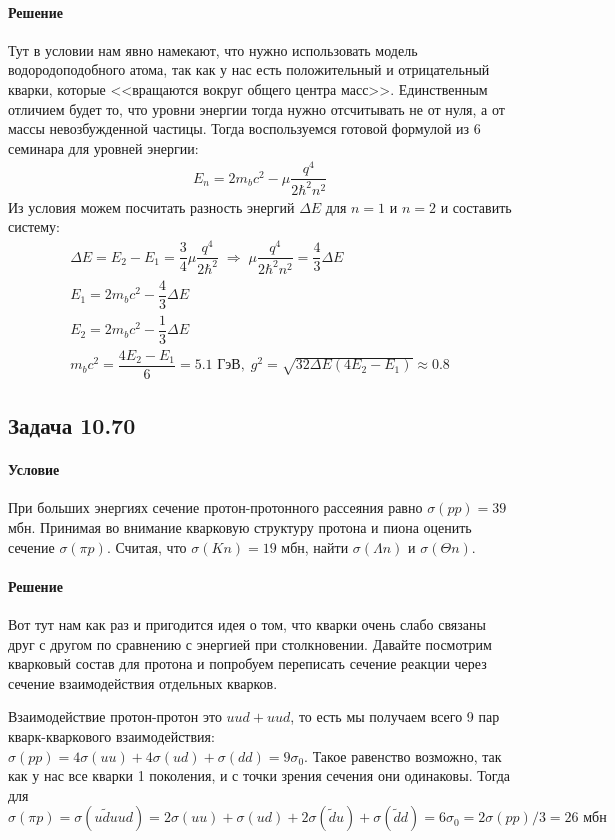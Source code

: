 \documentclass[12pt]{article}
\begin{document}
\paragraph{Решение}
Тут в условии нам явно намекают, что нужно использовать модель водородоподобного атома, так как у нас есть положительный и отрицательный кварки, которые <<вращаются вокруг общего центра масс>>. Единственным отличием будет то, что уровни энергии тогда нужно отсчитывать не от нуля, а от массы невозбужденной частицы. Тогда воспользуемся готовой формулой из 6 семинара для уровней энергии:
\begin{gather*}
    E_n = 2m_bc^2 - \mu\dfrac{q^4}{2\hbar^2n^2}
\end{gather*}
Из условия можем посчитать разность энергий $\Delta E$ для $n=1$ и $n=2$ и составить систему:
\begin{gather*}
    \Delta E = E_2 - E_1 = \dfrac{3}{4}\mu\dfrac{q^4}{2\hbar^2} \; \Rightarrow \; \mu\dfrac{q^4}{2\hbar^2n^2} = \dfrac{4}{3}\Delta E\\
    E_1 = 2m_bc^2 - \dfrac{4}{3}\Delta E\\
    E_2 = 2m_bc^2 - \dfrac{1}{3}\Delta E\\
    m_bc^2 = \dfrac{4E_2-E_1}{6} = 5.1 \text{ ГэВ}, \; g^2=\sqrt{32\Delta E(4E_2-E_1)} \approx 0.8
\end{gather*}

\subsection{Задача 10.70}
\label{task_10.70}
\paragraph{Условие}
При больших энергиях сечение протон-протонного рассеяния равно $\sigma(pp) = 39$ мбн. Принимая во внимание кварковую структуру протона и пиона оценить сечение $\sigma(\pi p)$. Считая, что $\sigma(Kn) = 19$ мбн, найти $\sigma(\Lambda n)$ и $\sigma(\Theta n)$.
\paragraph{Решение}
Вот тут нам как раз и пригодится идея о том, что кварки очень слабо связаны друг с другом по сравнению с энергией при столкновении. Давайте посмотрим кварковый состав для протона и попробуем переписать сечение реакции через сечение взаимодействия отдельных кварков. 

Взаимодействие протон-протон это $uud + uud$, то есть мы получаем всего 9 пар кварк-кваркового взаимодействия: $\sigma(pp) = 4\sigma(uu)+ 4\sigma(ud) +\sigma(dd) = 9\sigma_0$. Такое равенство возможно, так как у нас все кварки 1 поколения, и с точки зрения сечения они одинаковы. Тогда для $$\sigma(\pi p) = \sigma(u\widetilde{d} uud)=2\sigma(uu)+ \sigma(ud) + 2\sigma(\widetilde{d}u)+ \sigma(\widetilde{d}d) = 6\sigma_0 = 2\sigma(pp)/3 = 26\text{ мбн}$$
\end{document}
